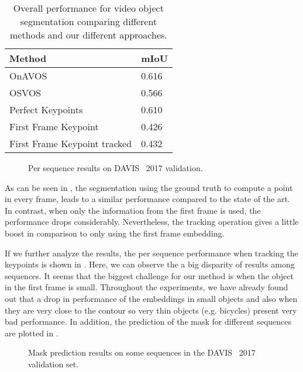 \begin{table}[h]
  \centering
  \begin{tabular}{l|l}
    \toprule
    Method                       & mIoU  \\
    \midrule
    OnAVOS~\onavos{}             & 0.616 \\
    OSVOS~\osvos{}               & 0.566 \\
    \midrule
    Perfect Keypoints            & 0.610 \\
    First Frame Keypoint         & 0.426 \\
    First Frame Keypoint tracked & 0.432 \\
    \bottomrule
  \end{tabular}
  \caption{Overall performance for video object segmentation comparing different methods and our different approaches.}
  \label{tab:experiments:videosegmentation:davismiou}
\end{table}

\begin{figure}[H]
  \centering
  
  \caption{Per sequence results on DAVIS~\davislast{} 2017 validation. }
  \label{fig:experiments:videosegmentation:persequencemiou}
\end{figure}

As can be seen in , the segmentation using the ground truth to compute a point in every frame, leads to a similar performance compared to the state of the art.
In contrast, when only the information from the first frame is used, the performance drops considerably.
Nevertheless, the tracking operation gives a little boost in comparison to only using the first frame embedding.

If we further analyze the results, the per sequence performance when tracking the keypoints is shown in .
Here, we can observe the a big disparity of results among sequences.
It seems that the biggest challenge for our method is when the object in the first frame is small.
Throughout the experiments, we have already found out that a drop in performance of the embeddings in small objects and also when they are very close to the contour so very thin objects (e.g. bicycles) present very bad performance.
In addition, the prediction of the mask for different sequences are plotted in .

\begin{figure}[ht]
  \centering
  \caption{Mask prediction results on some sequences in the DAVIS~\davislast{} 2017 validation set. }
  \label{fig:experiments:videosegmentation:predmasksdavis}
\end{figure}
